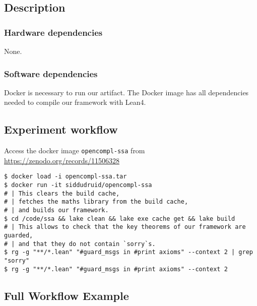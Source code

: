 \documentclass{sigplanconf}
\begin{document}
\subsection{Description}

\subsubsection{Hardware dependencies}

None.

\subsubsection{Software dependencies}

Docker is necessary to run our artifact.
The Docker image has all dependencies needed to compile our framework with Lean4.



\subsection{Experiment workflow}

Access the docker image \texttt{opencompl-ssa} from
\url{https://zenodo.org/records/11506328}

\begin{verbatim}
$ docker load -i opencompl-ssa.tar
$ docker run -it siddudruid/opencompl-ssa
# | This clears the build cache,
# | fetches the maths library from the build cache,
# | and builds our framework.
$ cd /code/ssa && lake clean && lake exe cache get && lake build
# | This allows to check that the key theorems of our framework are guarded,
# | and that they do not contain `sorry`s.
$ rg -g "**/*.lean" "#guard_msgs in #print axioms" --context 2 | grep "sorry"
$ rg -g "**/*.lean" "#guard_msgs in #print axioms" --context 2
\end{verbatim}

\subsection{Full Workflow Example}
\end{document}
